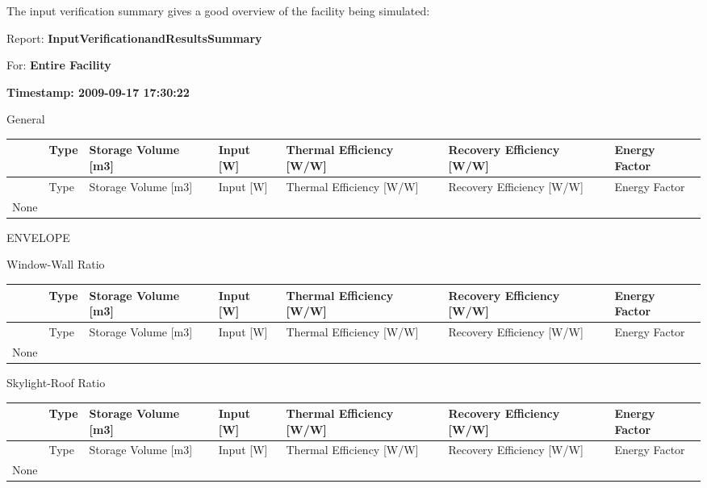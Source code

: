 The input verification summary gives a good overview of the facility being simulated:

Report: \textbf{InputVerificationandResultsSummary}

For: \textbf{Entire Facility}

\textbf{Timestamp: 2009-09-17 17:30:22}

General

\begin{longtable}[c]{p{0.85in}p{0.85in}p{0.85in}p{0.85in}p{0.85in}p{0.85in}p{0.85in}}
\toprule 
~ & Type & Storage Volume [m3] & Input [W] & Thermal Efficiency [W/W] & Recovery Efficiency [W/W] & Energy Factor \tabularnewline
\midrule
\endfirsthead

\toprule 
~ & Type & Storage Volume [m3] & Input [W] & Thermal Efficiency [W/W] & Recovery Efficiency [W/W] & Energy Factor \tabularnewline
\midrule
\endhead

None & ~ & ~ & ~ & ~ & ~ & ~ \tabularnewline
\bottomrule
\end{longtable}

ENVELOPE

Window-Wall Ratio

\begin{longtable}[c]{p{0.85in}p{0.85in}p{0.85in}p{0.85in}p{0.85in}p{0.85in}p{0.85in}}
\toprule 
~ & Type & Storage Volume [m3] & Input [W] & Thermal Efficiency [W/W] & Recovery Efficiency [W/W] & Energy Factor \tabularnewline
\midrule
\endfirsthead

\toprule 
~ & Type & Storage Volume [m3] & Input [W] & Thermal Efficiency [W/W] & Recovery Efficiency [W/W] & Energy Factor \tabularnewline
\midrule
\endhead

None & ~ & ~ & ~ & ~ & ~ & ~ \tabularnewline
\bottomrule
\end{longtable}

Skylight-Roof Ratio

\begin{longtable}[c]{p{0.85in}p{0.85in}p{0.85in}p{0.85in}p{0.85in}p{0.85in}p{0.85in}}
\toprule 
~ & Type & Storage Volume [m3] & Input [W] & Thermal Efficiency [W/W] & Recovery Efficiency [W/W] & Energy Factor \tabularnewline
\midrule
\endfirsthead

\toprule 
~ & Type & Storage Volume [m3] & Input [W] & Thermal Efficiency [W/W] & Recovery Efficiency [W/W] & Energy Factor \tabularnewline
\midrule
\endhead

None & ~ & ~ & ~ & ~ & ~ & ~ \tabularnewline
\bottomrule
\end{longtable}

